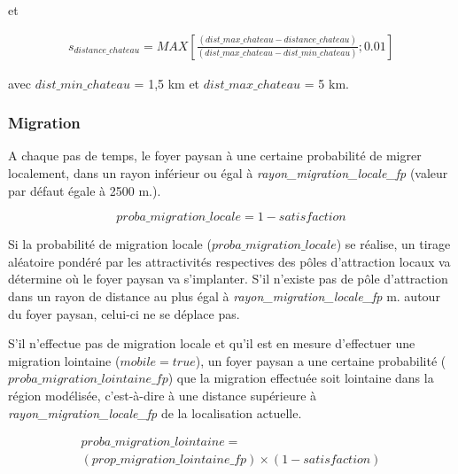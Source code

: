 \documentclass[a4paper,11pt]{article}
\begin{document}
{\begin{sloppypar}
\begin{enumerate}
et

\begin{small}
\begin{equation}
\begin{gathered}
s_{distance\_chateau} = MAX \left \lbrack \frac{(dist\_max\_chateau - distance\_chateau)}{(dist\_max\_chateau - dist\_min\_chateau)}; 0.01 \right \rbrack
\end{gathered}
\end{equation}

avec $dist\_min\_chateau$ = 1,5 km et $dist\_max\_chateau$ = 5 km.

\end{small}
\end{enumerate}
\end{sloppypar}


\subsubsection{Migration}
\begin{sloppypar}
A chaque pas de temps, le foyer paysan à une certaine probabilité de migrer localement, dans un rayon inférieur ou égal à \textit{rayon\_migration\_locale\_fp} (valeur par défaut égale à 2500 m.).

\begin{small}
\begin{equation}
proba\_migration\_locale = 1 - satisfaction
\end{equation}
\end{small}

Si la probabilité de migration locale ($proba\_migration\_locale$) se réalise, un tirage aléatoire pondéré par les attractivités respectives des pôles d'attraction locaux va détermine où le foyer paysan va s'implanter. S'il n'existe pas de pôle d'attraction dans un rayon de distance au plus égal à \textit{rayon\_migration\_locale\_fp} m. autour du foyer paysan, celui-ci ne se déplace pas.

\bigskip
S'il n'effectue pas de migration locale et qu'il est en mesure d'effectuer une migration lointaine ($ mobile = true $), un foyer paysan a une certaine probabilité ($proba\_migration\_lointaine\_fp$) que la migration effectuée soit lointaine dans la région modélisée, c'est-à-dire à une distance supérieure à \textit{rayon\_migration\_locale\_fp} de la localisation actuelle.

\begin{small}
\begin{equation}
\begin{gathered}
proba\_migration\_lointaine =  \\
(prop\_migration\_lointaine\_fp) \times (1 - satisfaction)
\end{gathered}
\end{equation}
\end{small}


\end{sloppypar}}
\end{document}
